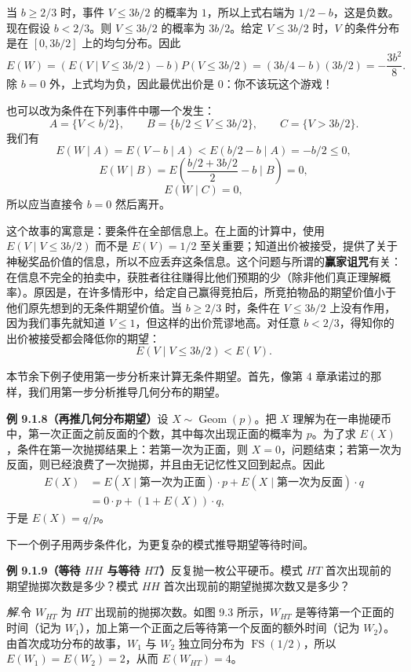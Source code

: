 \documentclass[UTF8,12pt,a4paper,fontset=fandol]{ctexart}
\begin{document}
当 $b\ge 2/3$ 时，事件 $V\le 3b/2$ 的概率为 $1$，所以上式右端为 $1/2-b$，这是负数。现在假设 $b<2/3$。则 $V\le 3b/2$ 的概率为 $3b/2$。给定 $V\le 3b/2$ 时，$V$ 的条件分布是在 $[0,3b/2]$ 上的均匀分布。因此
\[
  E(W)=\left(E(V\mid V\le 3b/2)-b\right)P(V\le 3b/2)
  =(3b/4-b)(3b/2)=-\frac{3b^2}{8}.
\]
除 $b=0$ 外，上式均为负，因此最优出价是 $0$：你不该玩这个游戏！

也可以改为条件在下列事件中哪一个发生：
\[
  A=\{V<b/2\},\qquad B=\{b/2\le V\le 3b/2\},\qquad C=\{V>3b/2\}.
\]
我们有
\[
  E(W\mid A)=E(V-b\mid A)<E(b/2-b\mid A)=-b/2\le0,
\]
\[
  E(W\mid B)=E\left(\frac{b/2+3b/2}{2}-b\mid B\right)=0,
\]
\[
  E(W\mid C)=0,
\]
所以应当直接令 $b=0$ 然后离开。

这个故事的寓意是：要条件在全部信息上。在上面的计算中，使用 $E(V\mid V\le 3b/2)$ 而不是 $E(V)=1/2$ 至关重要；知道出价被接受，提供了关于神秘奖品价值的信息，所以不应丢弃这条信息。这个问题与所谓的\textbf{赢家诅咒}有关：在信息不完全的拍卖中，获胜者往往赚得比他们预期的少（除非他们真正理解概率）。原因是，在许多情形中，给定自己赢得竞拍后，所竞拍物品的期望价值小于他们原先想到的无条件期望价值。当 $b\ge 2/3$ 时，条件在 $V\le 3b/2$ 上没有作用，因为我们事先就知道 $V\le1$，但这样的出价荒谬地高。对任意 $b<2/3$，得知你的出价被接受都会降低你的期望：
\[
  E(V\mid V\le 3b/2)<E(V).
\]

本节余下例子使用第一步分析来计算无条件期望。首先，像第 4 章承诺过的那样，我们用第一步分析推导几何分布的期望。

\noindent\textbf{例 9.1.8（再推几何分布期望）}\quad 设 $X\sim\operatorname{Geom}(p)$。把 $X$ 理解为在一串抛硬币中，第一次正面之前反面的个数，其中每次出现正面的概率为 $p$。为了求 $E(X)$，条件在第一次抛掷结果上：若第一次为正面，则 $X=0$，问题结束；若第一次为反面，则已经浪费了一次抛掷，并且由无记忆性又回到起点。因此
\[
\begin{aligned}
  E(X)
  &=E(X\mid \text{第一次为正面})\cdot p
    +E(X\mid \text{第一次为反面})\cdot q\\
  &=0\cdot p+(1+E(X))\cdot q,
\end{aligned}
\]
于是 $E(X)=q/p$。

下一个例子用两步条件化，为更复杂的模式推导期望等待时间。

\noindent\textbf{例 9.1.9（等待 $HH$ 与等待 $HT$）}\quad 反复抛一枚公平硬币。模式 $HT$ 首次出现前的期望抛掷次数是多少？模式 $HH$ 首次出现前的期望抛掷次数又是多少？

\noindent\textit{解.}\quad 令 $W_{HT}$ 为 $HT$ 出现前的抛掷次数。如图 9.3 所示，$W_{HT}$ 是等待第一个正面的时间（记为 $W_1$），加上第一个正面之后等待第一个反面的额外时间（记为 $W_2$）。由首次成功分布的故事，$W_1$ 与 $W_2$ 独立同分布为 $\operatorname{FS}(1/2)$，所以 $E(W_1)=E(W_2)=2$，从而 $E(W_{HT})=4$。
\end{document}
